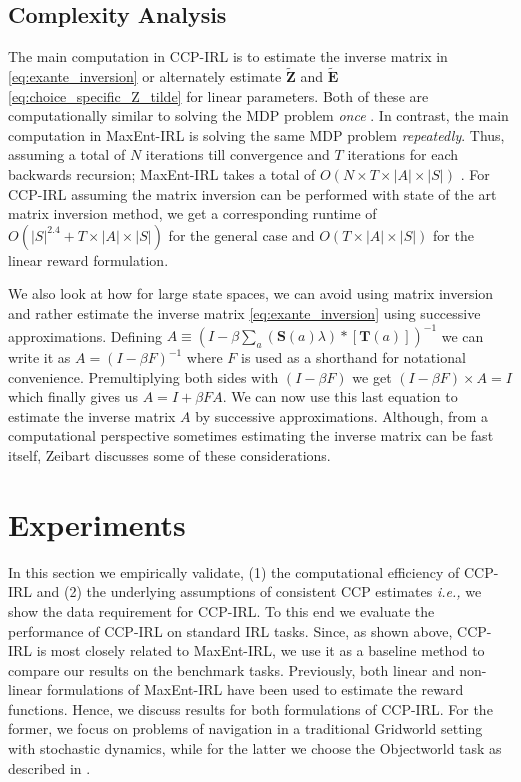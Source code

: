 \documentclass{article}
\begin{document}
\subsection{Complexity Analysis}
The main computation in CCP-IRL is to estimate the inverse matrix in \eqref{eq:exante_inversion} or alternately estimate $\tilde{\mathbf{Z}}$ and $\tilde{\mathbf{E}}$ \eqref{eq:choice_specific_Z_tilde} for linear parameters. Both of these are computationally similar to solving the MDP problem \emph{once} \cite{?Putterman}. 
In contrast, the main computation in MaxEnt-IRL is solving the same MDP problem \emph{repeatedly}.
Thus, assuming a total of $N$ iterations till convergence and $T$ iterations for each backwards recursion; MaxEnt-IRL takes a total of $O(N\times T \times|A|\times|S|)$ \cite{ziebart_phd}. For CCP-IRL assuming the matrix inversion can be performed with state of the art matrix inversion method, we get a corresponding runtime of $O(|S|^{2.4}+T\times|A|\times|S|)$ for the general case and $O(T\times|A|\times|S|)$ for the linear reward formulation.

We also look at how for large state spaces, we can avoid using matrix inversion and rather estimate the inverse matrix \eqref{eq:exante_inversion} using successive approximations.
Defining $A \equiv \left(I- \beta \sum_{a}(\mathbf{S}(a) \lambda) *\left[ \mathbf{T}(a)  \right]\right)^{-1}$ we can write it as $A = (I - \beta F)^{-1}$ where $F$ is used as a shorthand for notational convenience. Premultiplying both sides with $(I - \beta F)$ we get $(I - \beta F)\times A = I$ which finally gives us $A = I + \beta F A$. We can now use this last equation to estimate the inverse matrix $A$ by successive approximations. Although, from a computational perspective sometimes estimating the inverse matrix can be fast itself, Zeibart  discusses some of these considerations. 





\section{Experiments}

In this section we empirically validate,
(1) the computational efficiency of CCP-IRL and (2) the underlying assumptions of consistent CCP estimates \emph{i.e.,} we show the data requirement for CCP-IRL.
To this end we evaluate the performance of CCP-IRL on standard IRL tasks. Since, as shown above, CCP-IRL is most closely related to MaxEnt-IRL, we use it as a baseline method to compare our results on the benchmark tasks. Previously, both linear \cite{ziebart2010modeling} and non-linear \cite{wulfmeier2015maximum} formulations of MaxEnt-IRL have been used to estimate the reward functions. Hence, we discuss results for both formulations of CCP-IRL. For the former, we focus on problems of navigation in a traditional Gridworld setting with stochastic dynamics, while for the latter we choose the Objectworld task as described in \cite{Levine2013}.
\end{document}
